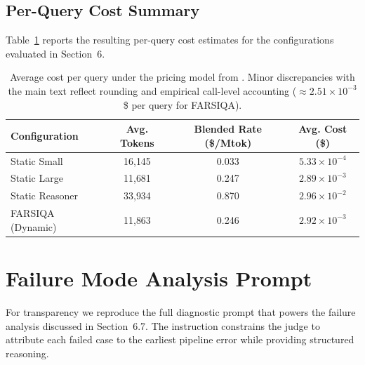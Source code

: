 \documentclass[11pt]{article}
\begin{document}
\subsection{Per-Query Cost Summary}

Table~\ref{tab:cost-summary} reports the resulting per-query cost estimates for the configurations evaluated in Section~6.

\begin{table}[t]
\centering
\small
\begin{tabular}{lccc}
\hline
\textbf{Configuration} & \textbf{Avg. Tokens} & \textbf{Blended Rate (\$/Mtok)} & \textbf{Avg. Cost (\$)} \\
\hline
Static Small & 16{,}145 & 0.033 & $5.33\times10^{-4}$ \\
Static Large & 11{,}681 & 0.247 & $2.89\times10^{-3}$ \\
Static Reasoner & 33{,}934 & 0.870 & $2.96\times10^{-2}$ \\
FARSIQA (Dynamic) & 11{,}863 & 0.246 & $2.92\times10^{-3}$ \\
\hline
\end{tabular}
\caption{Average cost per query under the pricing model from \cite{DeepInfraPricing2025}. Minor discrepancies with the main text reflect rounding and empirical call-level accounting ($\approx 2.51\times10^{-3}$ \$ per query for FARSIQA).}
\label{tab:cost-summary}
\end{table}

\section{Failure Mode Analysis Prompt}
\label{sec:appendix-failure}

For transparency we reproduce the full diagnostic prompt that powers the failure analysis discussed in Section~6.7. The instruction constrains the judge to attribute each failed case to the earliest pipeline error while providing structured reasoning.
\end{document}
